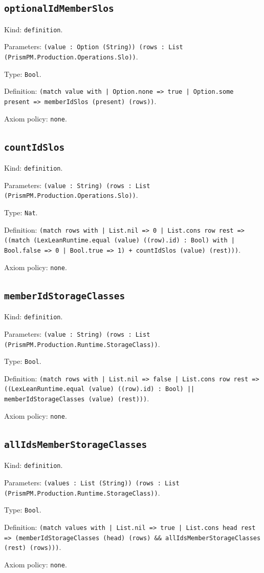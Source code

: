 \documentclass[11pt]{article}
\begin{document}
\subsection*{\texttt{optionalIdMemberSlos}}
\noindent Kind: \texttt{definition}.\par
\noindent Parameters: \texttt{(value : Option (String)) (rows : List (PrismPM.Production.Operations.Slo))}.\par
\noindent Type: \texttt{Bool}.\par
\noindent Definition: \texttt{(match value with | Option.none => true | Option.some present => memberIdSlos (present) (rows))}.\par
\noindent Axiom policy: \texttt{none}.\par
\subsection*{\texttt{countIdSlos}}
\noindent Kind: \texttt{definition}.\par
\noindent Parameters: \texttt{(value : String) (rows : List (PrismPM.Production.Operations.Slo))}.\par
\noindent Type: \texttt{Nat}.\par
\noindent Definition: \texttt{(match rows with | List.nil => 0 | List.cons row rest => ((match (LexLeanRuntime.equal (value) ((row).id) : Bool) with | Bool.false => 0 | Bool.true => 1) + countIdSlos (value) (rest)))}.\par
\noindent Axiom policy: \texttt{none}.\par
\subsection*{\texttt{memberIdStorageClasses}}
\noindent Kind: \texttt{definition}.\par
\noindent Parameters: \texttt{(value : String) (rows : List (PrismPM.Production.Runtime.StorageClass))}.\par
\noindent Type: \texttt{Bool}.\par
\noindent Definition: \texttt{(match rows with | List.nil => false | List.cons row rest => ((LexLeanRuntime.equal (value) ((row).id) : Bool) || memberIdStorageClasses (value) (rest)))}.\par
\noindent Axiom policy: \texttt{none}.\par
\subsection*{\texttt{allIdsMemberStorageClasses}}
\noindent Kind: \texttt{definition}.\par
\noindent Parameters: \texttt{(values : List (String)) (rows : List (PrismPM.Production.Runtime.StorageClass))}.\par
\noindent Type: \texttt{Bool}.\par
\noindent Definition: \texttt{(match values with | List.nil => true | List.cons head rest => (memberIdStorageClasses (head) (rows) \&\& allIdsMemberStorageClasses (rest) (rows)))}.\par
\noindent Axiom policy: \texttt{none}.\par
\end{document}
